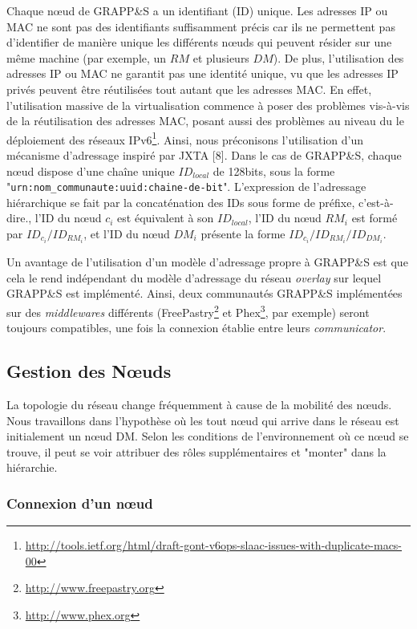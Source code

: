 Chaque n{\oe}ud de GRAPP\&S a un identifiant (ID) unique. Les adresses IP ou MAC ne sont pas des identifiants suffisamment précis car ils ne permettent pas d'identifier de manière unique les différents n{\oe}uds qui peuvent résider sur une même machine (par exemple, un $RM$ et plusieurs $DM$). De plus, l'utilisation des adresses IP ou MAC ne garantit pas une identité unique, vu que les adresses IP privés peuvent être réutilisées tout autant que les adresses MAC. En effet, l'utilisation massive de la virtualisation commence à poser des problèmes vis-à-vis de la réutilisation des adresses MAC, posant aussi des problèmes au niveau du le déploiement des réseaux IPv6\footnote{\url{http://tools.ietf.org/html/draft-gont-v6ops-slaac-issues-with-duplicate-macs-00}}. Ainsi, nous préconisons l'utilisation d'un mécanisme d'adressage inspiré par JXTA [8]. Dans le cas de GRAPP\&S, chaque n{\oe}ud dispose d'une chaîne unique $ID_{local}$ de 128bits, sous la forme "\texttt{urn:nom\_communaute:uuid:chaine-de-bit}". L'expression de l'adressage hiérarchique se fait par la concaténation des IDs sous forme de préfixe, c'est-à-dire., l'ID du n{\oe}ud $c_i$ est équivalent à son $ID_{local}$, l'ID du n{\oe}ud $RM_i$ est formé par $ID_{c_i}/ID_{RM_i}$, et l'ID du n{\oe}ud $DM_i$ présente la forme $ID_{c_i}/ID_{RM_i}/ID_{DM_i}$.

Un avantage de l'utilisation d'un modèle d'adressage propre à GRAPP\&S est que cela le rend indépendant du modèle d'adressage du réseau \textit{overlay} sur lequel GRAPP\&S est implémenté. Ainsi, deux communautés GRAPP\&S implémentées sur des \textit{middlewares} différents (FreePastry\footnote{\url{http://www.freepastry.org}} et Phex\footnote{\url{http://www.phex.org}}, par exemple) seront toujours compatibles, une fois la connexion établie entre leurs \textit{communicator}. 

\subsection{Gestion des N{\oe}uds}
La topologie du réseau change fréquemment à cause de la mobilité des n{\oe}uds. Nous travaillons dans l'hypothèse où les tout n{\oe}ud qui arrive dans le réseau est initialement un n{\oe}ud DM. Selon les conditions de l'environnement où ce n{\oe}ud se trouve, il peut se voir attribuer des rôles supplémentaires et "monter" dans la hiérarchie.

\subsubsection*{Connexion d'un n{\oe}ud}

